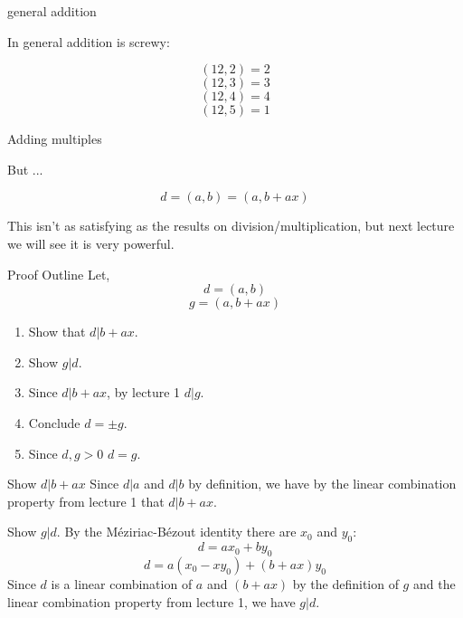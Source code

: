 \documentclass{beamer}
\begin{document}
\begin{frame}{general addition}

In general addition is screwy:

$$(12, 2) = 2$$
$$(12, 3) = 3$$
$$(12, 4) = 4$$
$$(12, 5) = 1$$

\end{frame}

\begin{frame}{Adding multiples}

But ...
\begin{theorem}
  $$d = (a, b) = (a, b + ax)$$
\end{theorem}

This isn't as satisfying as the results on division/multiplication,
but next lecture we will see it is very powerful.

\end{frame}

\begin{frame}{Proof Outline}
Let,
  $$d = (a, b) $$
  $$g = (a, b + ax)$$
  
  \begin{enumerate}
  \item Show that $d | b + ax$.
  \item Show $g | d$.
  \item Since $d | b + ax$, by lecture 1 $d | g$.
  \item Conclude $d = \pm g$.
  \item Since $d, g > 0$ $d = g$.
  \end{enumerate}
    
\end{frame}

\begin{frame}{Show $d | b + ax$}
  Since $d | a$ and $d | b$ by definition, we have by the linear
  combination property from lecture 1 that $d | b + ax$.
\end{frame}

\begin{frame}{Show $g | d$.}
  By the  M\'eziriac-B\'ezout identity there are $x_0$ and $y_0$:
  $$d = ax_0 + by_0$$
  $$d = a(x_0 - xy_0) + (b + ax)y_0$$
  Since $d$ is a linear combination of $a$ and $(b+ax)$ by the
  definition of $g$ and the linear combination property from lecture
  1, we have $g | d$.
\end{frame}
\end{document}
